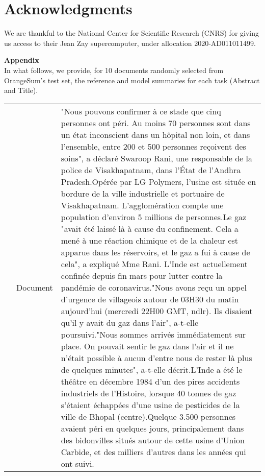 \documentclass[11pt,a4paper]{article}
\begin{document}
\section*{Acknowledgments}
We are thankful to the National Center for Scientific Research (CNRS) for giving us access to their Jean Zay supercomputer, under allocation 2020-AD011011499.




\newpage
\onecolumn

\noindent \textbf{\LARGE Appendix}\\
In what follows, we provide, for 10 documents randomly selected from OrangeSum's test set, the reference and model summaries for each task (Abstract and Title).

\begin{table}[h]
 \centering 
 \begin{tabular}{|cr|L|} 
 \hline 
  & Document & \baselineskip=10pt {\small "Nous pouvons confirmer à ce stade que cinq personnes ont péri. Au moins 70 personnes sont dans un état inconscient dans un hôpital non loin, et dans l'ensemble, entre 200 et 500 personnes reçoivent des soins", a déclaré Swaroop Rani, une responsable de la police de Visakhapatnam, dans l'État de l'Andhra Pradesh.Opérée par LG Polymers, l'usine est située en bordure de la ville industrielle et portuaire de Visakhapatnam. L'agglomération compte une population d'environ 5 millions de personnes.Le gaz "avait été laissé là à cause du confinement. Cela a mené à une réaction chimique et de la chaleur est apparue dans les réservoirs, et le gaz a fui à cause de cela", a expliqué Mme Rani. L'Inde est actuellement confinée depuis fin mars pour lutter contre la pandémie de coronavirus."Nous avons reçu un appel d'urgence de villageois autour de 03H30 du matin aujourd'hui (mercredi 22H00 GMT, ndlr). Ils disaient qu'il y avait du gaz dans l'air", a-t-elle poursuivi."Nous sommes arrivés immédiatement sur place. On pouvait sentir le gaz dans l'air et il ne n'était possible à aucun d'entre nous de rester là plus de quelques minutes", a-t-elle décrit.L'Inde a été le théâtre en décembre 1984 d'un des pires accidents industriels de l'Histoire, lorsque 40 tonnes de gaz s'étaient échappées d'une usine de pesticides de la ville de Bhopal (centre).Quelque 3.500 personnes avaient péri en quelques jours, principalement dans des bidonvilles situés autour de cette usine d'Union Carbide, et des milliers d'autres dans les années qui ont suivi.
  } \\

\end{tabular}
\end{table}
\end{document}
